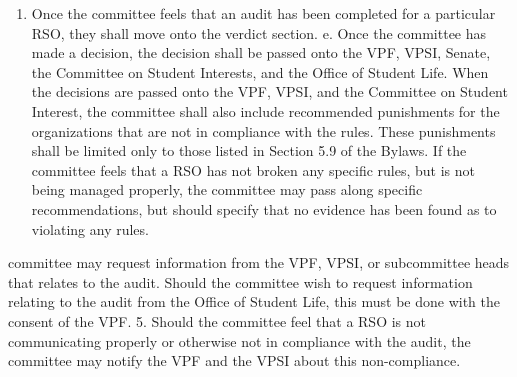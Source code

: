 \documentclass[12pt]{scrreprt}
\begin{document}
\begin{enumerate}
\begin{enumerate}
    \item Once the committee feels that an audit has been completed for a particular RSO, they shall move onto the verdict section. e. Once the committee has made a decision, the decision shall be passed onto the VPF, VPSI, Senate, the Committee on Student Interests, and the Office of Student Life. When the decisions are passed onto the VPF, VPSI, and the Committee on Student Interest, the committee shall also include recommended punishments for the organizations that are not in compliance with the rules. These punishments shall be limited only to those listed in Section 5.9 of the Bylaws. If the committee feels that a RSO has not broken any specific rules, but is not being managed properly, the committee may pass along specific recommendations, but should specify that no evidence has been found as to violating any rules.
    \end{enumerate}
    \itemThe committee may request information from the VPF, VPSI, or subcommittee heads that relates to the audit. Should the committee wish to request information relating to the audit from the Office of Student Life, this must be done with the consent of the VPF. 5. Should the committee feel that a RSO is not communicating properly or otherwise not in compliance with the audit, the committee may notify the VPF and the VPSI about this non-compliance.
\end{enumerate}
\end{document}
